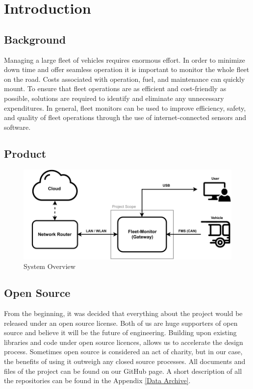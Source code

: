 \newcommand{\package}{\emph}

\chapter{Introduction}
\section{Background}
Managing a large fleet of vehicles requires enormous effort. In order to minimize down time and offer seamless operation it is important to monitor the whole fleet on the road. Costs associated with operation, fuel, and maintenance can quickly mount. To ensure that fleet operations are as efficient and cost-friendly as possible, solutions are required to identify and eliminate any unnecessary expenditures. In general, fleet monitors can be used to improve efficiency, safety, and quality of fleet operations through the use of internet-connected sensors and software.

\section{Product}

\bigskip
\begin{figure}[h!]
	\centering
	\includegraphics[width=\textwidth]{images/System_Overview}
	\vspace{-0.3cm}
	\caption{System Overview}
	\label{fig:system-overview}
\end{figure}

\section{Open Source}
From the beginning, it was decided that everything about the project would be released under an open source license. Both of us are huge supporters of open source and believe it will be the future of engineering. Building upon existing libraries and code under open source licences, allows us to accelerate the design process. Sometimes open source is considered an act of charity, but in our case, the benefits of using it outweigh any closed source processes. All documents and files of the project can be found on our GitHub page. A short description of all the repositories can be found in the Appendix \ref{Data Archive}.
